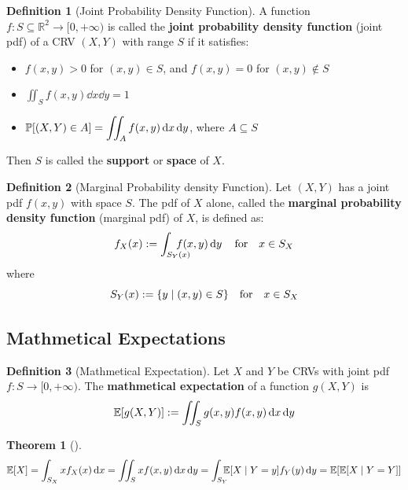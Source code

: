 \documentclass[10pt,UTF8]{article}
\newenvironment{definition box}
{\begin{tcolorbox}[colback=blue!5!white,colframe=blue!75!black,parbox=false,before upper=\par,before lower=\par]}
{\end{tcolorbox}}
\newenvironment{theorem box}
{\begin{tcolorbox}[colback=yellow!5!white,colframe=yellow!75!black,parbox=false,before upper=\par,before lower=\par]}
{\end{tcolorbox}}
\theoremstyle{definition}
\newtheorem{definition inner}{Definition}[section]
\newenvironment{definition}[1][]
{\begin{definition box}\begin{definition inner}[#1]\hfill\par}
{\end{definition inner}\end{definition box}}
\theoremstyle{plain}
\newtheorem{theorem inner}{Theorem}[section]
\newenvironment{theorem}[1][]
{\begin{theorem box}\begin{theorem inner}[#1]\hfill\par}
{\end{theorem inner}\end{theorem box}}
\theoremstyle{definition}
\newtheorem*{proof inner}{\textit{Proof}}
\theoremstyle{remark}
\newcommand{\E}[1]{\mathbb{E}\qty[#1]}  %
\newcommand{\Prob}{\mathbb{P}\qty}
\begin{document}
\begin{definition}[Joint Probability Density Function]
    A function $f\colon S\subseteq\mathbb{R}^2\rightarrow[0,+\infty)$
    is called the \textbf{joint probability density function} (joint pdf) of
    a CRV $(X,Y)$ with range $S$ if it satisfies:
    \begin{itemize}
        \item $f(x,y)>0$ for $(x,y)\in S$,
        and $f(x,y)=0$ for $(x,y)\notin S$
        \item $\displaystyle\iint_{S}f(x,y)\dd{x}\dd{y}=1$
        \item $\displaystyle \Prob[(X,Y)\in A]=\iint_{A}f(x,y)\dd{x}\dd{y}$,
        where $A\subseteq S$
    \end{itemize}
    Then $S$ is called the \textbf{support} or \textbf{space} of $X$.
\end{definition}

\begin{definition}[Marginal Probability density Function]
    Let $(X,Y)$ has a joint pdf $f(x,y)$ with space $S$.
    The pdf of $X$ alone,
    called the \textbf{marginal probability density function}
    (marginal pdf) of $X$, is defined as:
    \begin{equation*}
        f_X(x) :=  \int_{S_Y(x)}\!\!\!\!\!\!\!\!\!f(x,y)\dd{y}
        \qfor x\in S_X
    \end{equation*}
    where
    \begin{equation*}
        S_Y(x) := \{y\mid(x,y)\in S\} \qfor x\in S_X
    \end{equation*}
\end{definition}


\subsection{Mathmetical Expectations}

\begin{definition}[Mathmetical Expectation]
    Let $X$ and $Y$ be CRVs with joint pdf $f\colon S\rightarrow [0,+\infty)$.
    The \textbf{mathmetical expectation} of a function $g(X,Y)$ is
    \begin{equation*}
        \E{g(X,Y)} := \iint_{S}g(x,y)f(x,y)\dd{x}\dd{y}
    \end{equation*}
\end{definition}
\begin{theorem}
    \begin{equation*}
        \E{X} = \int_{S_X}x f_X(x)\dd{x}
        = \iint_{S}x f(x,y)\dd{x}\dd{y}
        = \int_{S_Y}\!\!\!\! \E{X\mid Y=y}f_Y(y)\dd{y}
        = \E{\E{X\mid Y=Y}}
    \end{equation*}
\end{theorem}
\end{document}
